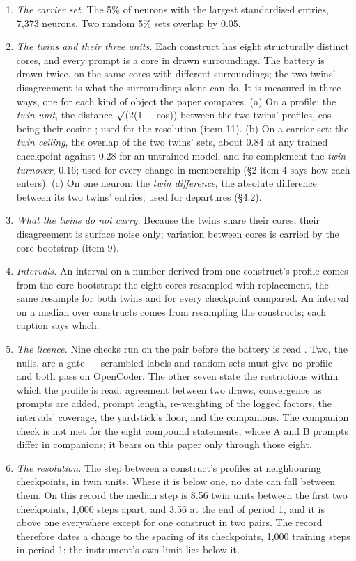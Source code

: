 \documentclass{article}
\begin{document}
\begin{enumerate}[topsep=2pt,itemsep=1pt,parsep=0pt,partopsep=0pt,leftmargin=*]
\item \emph{The carrier set.} The 5\% of neurons with the largest standardised entries, 7,373 neurons. Two random 5\% sets overlap by 0.05.
\item \emph{The twins and their three units.} Each construct has eight structurally distinct cores, and every prompt is a core in drawn surroundings. The battery is drawn twice, on the same cores with different surroundings; the two twins' disagreement is what the surroundings alone can do. It is measured in three ways, one for each kind of object the paper compares. (a) On a profile: the \emph{twin unit}, the distance $\surd$(2(1 $-$ cos)) between the two twins' profiles, cos being their cosine \citep[\S2.4]{wilam2026}; used for the resolution (item 11). (b) On a carrier set: the \emph{twin ceiling}, the overlap of the two twins' sets, about 0.84 at any trained checkpoint against 0.28 for an untrained model, and its complement the \emph{twin turnover}, 0.16; used for every change in membership (\S2 item 4 says how each enters). (c) On one neuron: the \emph{twin difference}, the absolute difference between its two twins' entries; used for departures (\S4.2).
\item \emph{What the twins do not carry.} Because the twins share their cores, their disagreement is surface noise only; variation between cores is carried by the core bootstrap (item 9).
\item \emph{Intervals.} An interval on a number derived from one construct's profile comes from the core bootstrap: the eight cores resampled with replacement, the same resample for both twins and for every checkpoint compared. An interval on a median over constructs comes from resampling the constructs; each caption says which.
\item \emph{The licence.} Nine checks run on the pair before the battery is read \citep[\S2.5, \S4.1]{wilam2026}. Two, the nulls, are a gate --- scrambled labels and random sets must give no profile --- and both pass on OpenCoder. The other seven state the restrictions within which the profile is read: agreement between two draws, convergence as prompts are added, prompt length, re-weighting of the logged factors, the intervals' coverage, the yardstick's floor, and the companions. The companion check is not met for the eight compound statements, whose A and B prompts differ in companions; it bears on this paper only through those eight.
\item \emph{The resolution.} The step between a construct's profiles at neighbouring checkpoints, in twin units. Where it is below one, no date can fall between them. On this record the median step is 8.56 twin units between the first two checkpoints, 1,000 steps apart, and 3.56 at the end of period 1, and it is above one everywhere except for one construct in two pairs. The record therefore dates a change to the spacing of its checkpoints, 1,000 training steps in period 1; the instrument's own limit lies below it.
\end{enumerate}
\end{document}
